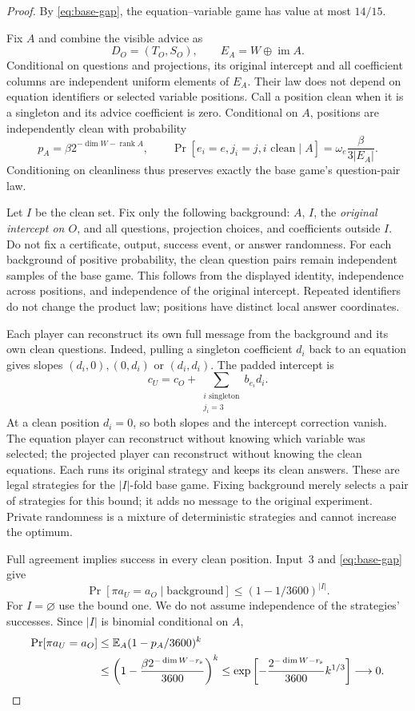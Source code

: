 \documentclass[11pt]{article}
\newcommand{\E}{\mathbb E}
\newcommand{\rank}{\operatorname{rank}}
\begin{document}
\begin{proof}
By \eqref{eq:base-gap}, the equation--variable game has value at most
$14/15$.

Fix $A$ and combine the visible advice as
\[
 D_O=(T_O,S_O),\qquad E_A=W\oplus\operatorname{im}A.
\]
Conditional on questions and projections, its original intercept and all
coefficient columns are independent uniform elements of $E_A$. Their law
does not depend on equation identifiers or selected variable positions.
Call a position clean when it is a singleton and its advice coefficient
is zero. Conditional on $A$, positions are independently clean with
probability
\[
 p_A=\beta 2^{-\dim W-\rank A},\qquad
 \Pr[e_i=e,j_i=j,i\text{ clean}\mid A]
       =\omega_e\frac{\beta}{3|E_A|}.
\]
Conditioning on cleanliness thus preserves exactly the base game's
question-pair law.

Let $I$ be the clean set. Fix only the following background: $A$, $I$,
the \emph{original intercept on $O$}, and all questions, projection choices,
and coefficients outside $I$. Do not fix a certificate, output, success
event, or answer randomness. For each background of positive probability,
the clean question pairs remain independent samples of the base game.
This follows from the displayed identity, independence across positions,
and independence of the original intercept. Repeated identifiers do not
change the product law; positions have distinct local answer coordinates.

Each player can reconstruct its own full message from the background
and its own clean questions. Indeed, pulling a singleton coefficient
$d_i$ back to an equation gives slopes
$(d_i,0),(0,d_i)$ or $(d_i,d_i)$. The padded intercept is
\[
 c_U=c_O+\sum_{\substack{i\text{ singleton}\\j_i=3}}b_{e_i}d_i.
\]
At a clean position $d_i=0$, so both slopes and the intercept correction
vanish. The equation player can reconstruct without knowing which variable
was selected; the projected player can reconstruct without knowing the
clean equations. Each runs its original strategy and keeps its clean
answers. These are legal strategies for the $|I|$-fold base game. Fixing
background merely selects a pair of strategies for this bound; it adds
no message to the original experiment. Private randomness is a mixture
of deterministic strategies and cannot increase the optimum.

Full agreement implies success in every clean position. Input~3 and
\eqref{eq:base-gap} give
\[
 \Pr[\pi a_U=a_O\mid\text{background}]\le(1-1/3600)^{|I|}.
\]
For $I=\varnothing$ use the bound one. We do not assume independence of
the strategies' successes. Since $|I|$ is binomial conditional on $A$,
\begin{align}
 \Pr[\pi a_U=a_O]
 &\le\E_A(1-p_A/3600)^k\nonumber\\
 &\le\left(1-\frac{\beta 2^{-\dim W-r_{\rm s}}}{3600}\right)^k
 \le\exp\left[-\frac{2^{-\dim W-r_{\rm s}}}{3600}k^{1/3}\right]
 \longrightarrow0.\label{eq:clean-upper}
\end{align}
\end{proof}
\end{document}
